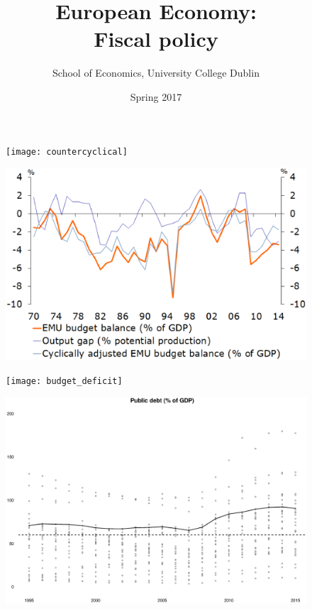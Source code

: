 \documentclass{beamer}
\title{European Economy:\\ Fiscal policy}
\author{School of Economics, University College Dublin}
\date{Spring 2017}
\begin{document}
\begin{frame}
\titlepage  
\end{frame}

\begin{frame}
  \begin{figure}
    \texttt{[image: countercyclical]}
  \end{figure}
\end{frame}


\begin{frame}
  \begin{figure}
    \includegraphics[scale=.4]{nl_budget}
  \end{figure}
\end{frame}

\begin{frame}
  \begin{figure}
    \texttt{[image: budget\_deficit]}
  \end{figure}
\end{frame}

\begin{frame}
  \begin{figure}
    \includegraphics[scale=.3]{public_debt2}
  \end{figure}
\end{frame}
\end{document}
